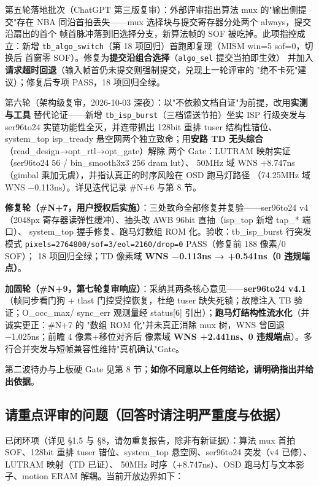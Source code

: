 \documentclass[10pt]{ctexart}
\newcommand{\code}[1]{\texttt{#1}}
\begin{document}
第五轮落地批次（ChatGPT 第三版复审）：外部评审指出算法 mux 的"输出侧提交"存在
NBA 同沿首拍丢失——mux 选择块与提交寄存器分处两个 always，提交沿扇出的首个
帧首脉冲落到旧选择分支，新算法帧的 SOF 被吃掉。此项指控成立：新增
\code{tb\_algo\_switch}（第 18 项回归）首跑即复现（MISM win=5 sof=0，切换后
首窗零 SOF）。修复为\textbf{提交沿组合选择}（\code{algo\_sel} 提交当拍即生效）
并加入\textbf{请求超时回退}（输入帧首仍未提交则强制提交，兑现上一轮评审的
"绝不卡死"建议）；修复后专项 PASS，18 项回归全绿。

第六轮（架构级复审，2026-10-03 深夜）：以"不依赖文档自证"为前提，改用\textbf{实测与工具}
替代论证——新增 \code{tb\_isp\_burst}（三档馈送节拍）坐实 ISP 行级突发与 ser96to24
实链功能性全灭，并连带抓出 128bit 重排 tuser 结构性错位、system\_top isp\_tready
悬空网两个独立致命；用\textbf{安路 TD 无头综合}（read\_design→opt\_rtl→opt\_gate）解除
两个 Gate：LUTRAM 映射实证（ser96to24 56 / bin\_smooth3x3 256 dram lut）、
50MHz 域 WNS +8.747ns（gimbal 乘加无虞），并指认真正的时序风险在 OSD 跑马灯路径
（74.25MHz 域 WNS −0.113ns）。详见迭代记录 \#N+6 与第 8 节。

\textbf{修复轮（\#N+7，用户授权后实施）}：三处致命全部修复并复验——ser96to24 v4
（2048px 寄存器读弹性缓冲）、抽头改 AWB 96bit 直抽（isp\_top 新增 tap\_* 端口）、
system\_top 握手修复、跑马灯数组 ROM 化。验收：tb\_isp\_burst 行突发模式
\code{pixels=2764800/sof=3/eol=2160/drop=0} PASS（修复前 188 像素/0 SOF）；
18 项回归全绿；TD 像素域 \textbf{WNS −0.113ns → +0.541ns（0 违规端点）}。

\textbf{加固轮（\#N+9，第七轮复审响应）}：采纳其两条核心意见——\textbf{ser96to24 v4.1}
（帧同步看门狗 + tlast 门控受控恢复，杜绝 tuser 缺失死锁；故障注入 TB 验证；O\_occ\_max/
sync\_err 观测量经 status[6] 引出）；\textbf{跑马灯结构性流水化}（并诚实更正：\#N+7 的
"数组 ROM 化"并未真正消除 mux 树，WNS 曾回退 −1.025ns；前瞻 4 像素+移位对齐后
像素域 \textbf{WNS +2.441ns、0 违规端点}）。多行合并突发与短帧兼容性维持"真机确认"Gate。

第二波待办与上板硬 Gate 见第 8 节；\textbf{如你不同意以上任何结论，请明确指出并给出依据}。

\subsection{请重点评审的问题（回答时请注明严重度与依据）}

已闭环项（详见 §1.5 与 §8，请勿重复报告，除非有新证据）：算法 mux 首拍 SOF、128bit 重排
tuser 错位、system\_top 悬空网、ser96to24 突发（v4 已修）、LUTRAM 映射（TD 已证）、
50MHz 时序（+8.747ns）、OSD 跑马灯与文本影子、motion ERAM 解耦。当前开放边界如下：
\end{document}
